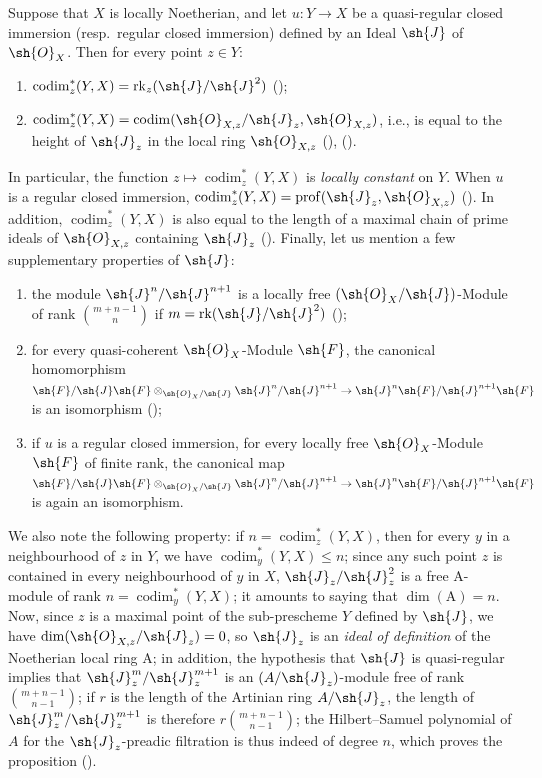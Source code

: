 \begin{env}[19.1.4]
\label{IV.19.1.4}
Suppose that $X$ is locally Noetherian, and let $u:Y\to X$ be a quasi-regular closed immersion (resp.\ regular closed immersion) defined by an Ideal $\sh{J}$ of $\sh{O}_X$.
Then for every point $z\in Y$:
\begin{enumerate}[label=\emph{\alph*)}]
  \item $\operatorname{codim}_z^*(Y,X)=\operatorname{rk}_z(\sh{J}/\sh{J}^2)$ ();
  \item $\operatorname{codim}_z^*(Y,X)=\operatorname{codim}(\sh{O}_{X,z}/\sh{J}_z,\sh{O}_{X,z})$, i.e., is equal to the height of $\sh{J}_z$ in the local ring $\sh{O}_{X,z}$ (), ().
\end{enumerate}
In particular, the function $z\mapsto\operatorname{codim}_z^*(Y,X)$ is \emph{locally constant} on $Y$.
When $u$ is a regular closed immersion, $\operatorname{codim}_z^*(Y,X)=\operatorname{prof}(\sh{J}_z,\sh{O}_{X,z})$ ().
In addition, $\operatorname{codim}_z^*(Y,X)$ is also equal to the length of a maximal chain of prime ideals of $\sh{O}_{X,z}$ containing $\sh{J}_z$ ().
Finally, let us mention a few supplementary properties of $\sh{J}$:
\begin{enumerate}[label=\emph{\alph*)}]
  \item the module $\sh{J}^n/\sh{J}^{n+1}$ is a locally free $(\sh{O}_X/\sh{J})$-Module of rank $\binom{m+n-1}{n}$ if $m=\operatorname{rk}(\sh{J}/\sh{J}^2)$ ();
  \item for every quasi-coherent $\sh{O}_X$-Module $\sh{F}$, the canonical homomorphism $\sh{F}/\sh{J}\sh{F}\otimes_{\sh{O}_X/\sh{J}}\sh{J}^n/\sh{J}^{n+1}\to\sh{J}^n\sh{F}/\sh{J}^{n+1}\sh{F}$ is an isomorphism ();
  \item if $u$ is a regular closed immersion, for every locally free $\sh{O}_X$-Module $\sh{F}$ of finite rank, the canonical map $\sh{F}/\sh{J}\sh{F}\otimes_{\sh{O}_X/\sh{J}}\sh{J}^n/\sh{J}^{n+1}\to\sh{J}^n\sh{F}/\sh{J}^{n+1}\sh{F}$ is again an isomorphism.
\end{enumerate}

We also note the following property: if $n=\operatorname{codim}_z^*(Y,X)$, then for every $y$ in
a neighbourhood of $z$ in $Y$, we have $\operatorname{codim}_y^*(Y,X)\leq n$; since any such point $z$ is contained in every neighbourhood of $y$ in $X$, $\sh{J}_z/\sh{J}_z^2$ is a free A-module of rank $n=\operatorname{codim}_y^*(Y,X)$; it amounts to saying that $\dim(\mathrm{A})=n$.
Now, since $z$ is a maximal point of the sub-prescheme $Y$ defined by $\sh{J}$, we have $\dim(\sh{O}_{X,z}/\sh{J}_z)=0$, so $\sh{J}_z$ is an \emph{ideal of definition} of the Noetherian local ring A; in addition, the hypothesis that $\sh{J}$ is quasi-regular implies that $\sh{J}_z^m/\sh{J}_z^{m+1}$ is an $(A/\sh{J}_z)$-module free of rank $\binom{m+n-1}{n-1}$; if $r$ is the length of the Artinian ring $A/\sh{J}_z$, the length of $\sh{J}_z^m/\sh{J}_z^{m+1}$ is therefore $r\binom{m+n-1}{n-1}$; the Hilbert--Samuel polynomial of $A$ for the $\sh{J}_z$-preadic filtration is thus indeed of degree $n$, which proves the proposition ().


\end{env}
